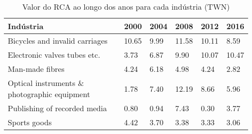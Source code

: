 \begin{table}
\centering
\caption{Valor do RCA ao longo dos anos para cada indústria (TWN)}
\label{tab:ex3-tempo-TWN}
\begin{tabular}{p{6cm}p{1.5cm}p{1.5cm}p{1.5cm}p{1.5cm}p{1.5cm}}
\toprule
                                   Indústria &  2000 & 2004 &  2008 &  2012 &  2016 \\
\midrule
              Bicycles and invalid carriages & 10.65 & 9.99 & 11.58 & 10.11 &  8.59 \\
                Electronic valves tubes etc. &  3.73 & 6.87 &  9.90 & 10.07 & 10.47 \\
                             Man-made fibres &  4.24 & 6.18 &  4.98 &  4.24 &  2.82 \\
Optical instruments \& photographic equipment &  1.78 & 7.40 & 12.19 &  8.66 &  5.96 \\
                Publishing of recorded media &  0.80 & 0.94 &  7.43 &  0.30 &  3.77 \\
                                Sports goods &  4.42 & 3.70 &  3.38 &  3.33 &  3.06 \\
\bottomrule
\end{tabular}
\end{table}
